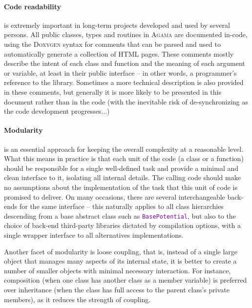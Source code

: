 \documentclass[12pt]{article}
\newcommand{\Agama}{\textsc{Agama}\xspace}
\newcommand{\ttt}[1]{\textcolor{darkviolet}{\texttt{#1}}}
\let\oldparagraph\paragraph
\renewcommand{\paragraph}[1]{\vspace{-2mm}\oldparagraph{#1}}
\begin{document}
\paragraph{Code readability} is extremely important in long-term projects developed and used by several persons. All public classes, types and routines in \Agama are documented in-code, using the \textsc{Doxygen} syntax for comments that can be parsed and used to automatically generate a collection of HTML pages. These comments mostly describe the intent of each class and function and the meaning of each argument or variable, at least in their public interface -- in other words, a programmer's reference to the library. Sometimes a more technical description is also provided in these comments, but generally it is more likely to be presented in this document rather than in the code (with the inevitable risk of de-synchronizing as the code development progresses...)

\paragraph{Modularity} is an essential approach for keeping the overall complexity at a reasonable level. What this means in practice is that each unit of the code (a class or a function) should be responsible for a single well-defined task and provide a minimal and clean interface to it, isolating all internal details. The calling code should make no assumptions about the implementation of the task that this unit of code is promised to deliver. On many occasions, there are several interchangeable back-ends for the same interface -- this naturally applies to all class hierarchies descending from a base abstract class such as \ttt{BasePotential}, but also to the choice of back-end third-party libraries dictated by compilation options, with a single wrapper interface to all alternatives implementations.

Another facet of modularity is loose coupling, that is, instead of a single large object that manages many aspects of its internal state, it is better to create a number of smaller objects with minimal necessary interaction. For instance, composition (when one class has another class as a member variable) is preferred over inheritance (when the class has full access to the parent class's private members), as it reduces the strength of coupling.
\end{document}
